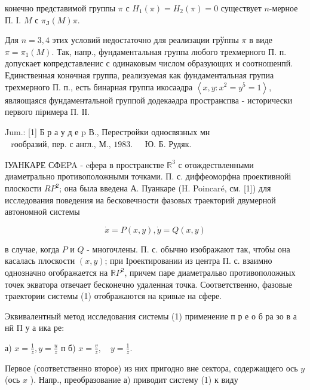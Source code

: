 \documentclass[10pt]{article}
\begin{document}
конечно представимой группы $\pi$ с $H_{1}(\pi)=H_{2}(\pi)=0$ существует $n$-мерное П. І. $M$ с $\pi_{\mathbf{J}}(M) \pi$.



Для $n=3,4$ этих условий недостаточно для реализации грўппы $\pi$ в виде $\pi=\pi_{1}(M)$. Так, напр., фундаментальная группа любого трехмерного П. п. допускает копредставленис с одинаковым числом образующих и соотношенпй. Единственная конөчная группа, реализуемая как фундаментальная групиа трехмерного П. п., есть бинарная группа икосаәдра $\left\langle x, y: x^{2}=y^{5}=1\right\rangle$, являощаяся фундаментальной группой додекаәдра пространспва - исторически первого піримера П. ІІ.



Jum.: [1] Б р а у д е p В., Перестройки односвязных мн$\begin{array}{ll}\text { rообразий, пер. с англ., М., 1983. } & \text { Ю. Б. Рудяк. }\end{array}$



IУАНКАРЕ СФEPA - cфера в пространстве $\mathbb{R}^{3}$ с отождествленными диаметрально противоположными точками. П. с. диффеоморфна проективнойі плоскости $R P^{2}$; она была введена А. Пуанкаре (H. Poincaré, см. [1]) для исследования поведения иа бесковечности фазовых траекторий двумерной автономной системы



\[

\dot{x}=P(x, y), \dot{y}=Q(x, y)

\]



в случае, когда $P$ и $Q$ - многочлены. П. с. обычно изображают так, чтобы она касалась плоскости $(x, y)$; при Іроектировании из центра П. с. взаимно однозначно огображается на $\mathbb{R} P^{2}$, причем паре диаметральво противоположных точек экватора отвечает бесконечно удаленная точка. Соответственно, фазовые траектории системы (1) отображаются на кривые на сфере.



Эквивалентный метод исследования системы (1) применение п р е о б ра зо в а нй П у а ика ре:



а) $x=\frac{1}{z}, y=\frac{u}{z}$ п б) $x=\frac{v}{z}, \quad y=\frac{1}{z}$.



Первое (соответственно второе) из них пригодно вне сектора, содержаццего ось $y$ (ось $x$ ). Напр., преобразование а) приводит систему (1) к виду
\end{document}
